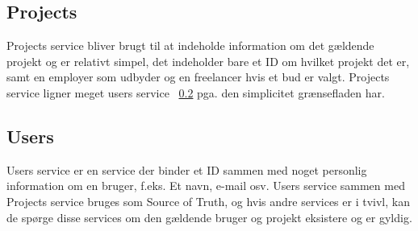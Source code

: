 \subsection{Projects}
\label{sec:projects-service}

Projects service bliver brugt til at indeholde information om det gældende projekt og er relativt simpel, det indeholder bare et ID om hvilket projekt det er, samt en employer som udbyder og en freelancer hvis et bud er valgt. Projects service ligner meget users service  ~\ref{sec:users-service} pga. den simplicitet grænsefladen har.

\subsection{Users}
\label{sec:users-service}

Users service er en service der binder et ID sammen med noget personlig information om en bruger, f.eks. Et navn, e-mail osv. Users service sammen med Projects service bruges som Source of Truth, og hvis andre services er i tvivl, kan de spørge disse services om den gældende bruger og projekt eksistere og er gyldig.

